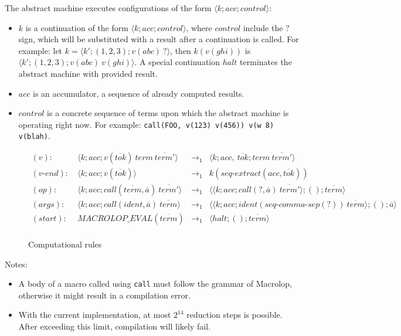 \documentclass[a4paper, 12pt]{article}
\begin{document}
The abstract machine executes configurations of the form $\langle k; acc; control \rangle$:

\begin{itemize}
    \item $k$ is a continuation of the form $\langle k; acc; control \rangle$, where
    $control$ include the $?$ sign, which will be substituted with a result after a
    continuation is called. For example: let $k = \langle k'; (1, 2, 3); v(abc) \ ? \rangle$,
    then $k(v(ghi))$ is $\langle k'; (1, 2, 3); v(abc) \ v(ghi) \rangle$. A special
    continuation $halt$ terminates the abstract machine with provided result.

    \item $acc$ is an accumulator, a sequence of already computed results.

    \item $control$ is a concrete sequence of terms upon which the abstract machine is
    operating right now. For example: \texttt{call(FOO, v(123) v(456)) v(w 8) v(blah)}.
\end{itemize}

\begin{figure}[H]
    \caption{Computational rules}

    \begin{align*}
        (v): \ & \langle k; acc; v(\overline{tok}) \ term \ \overline{term'} \rangle & \to_1 &
            \langle k; acc, \ \overline{tok}; term \ \overline{term'} \rangle \\
        (v\mbox{-}end): \ & \langle k; acc; v(\overline{tok}) \rangle & \to_1 &
            k(seq\mbox{-}extract(acc, \overline{tok})) \\
        (op): \ & \langle k; acc; call(\overline{term}, \overline{a}) \ \overline{term'} \rangle & \to_1 &
            \langle \langle k; acc; call(?, \overline{a}) \ \overline{term'} \rangle; (); \overline{term} \rangle \\
        (args): \ & \langle k; acc; call(ident, \overline{a}) \ \overline{term} \rangle & \to_1 &
            \langle \langle k; acc; ident(seq\mbox{-}comma\mbox{-}sep(?)) \ \overline{term} \rangle; (); \overline{a} \rangle \\
        (start): \ & MACROLOP\_EVAL(\overline{term}) & \to_1 &
            \langle halt; (); \overline{term} \rangle \\
    \end{align*}
\end{figure}

Notes:

\begin{itemize}
    \item A body of a macro called using \texttt{call} must follow the grammar of
    Macrolop, otherwise it might result in a compilation error.
    \item With the current implementation, at most $2^{14}$ reduction steps is
    possible. After exceeding this limit, compilation will likely fail.
\end{itemize}
\end{document}
